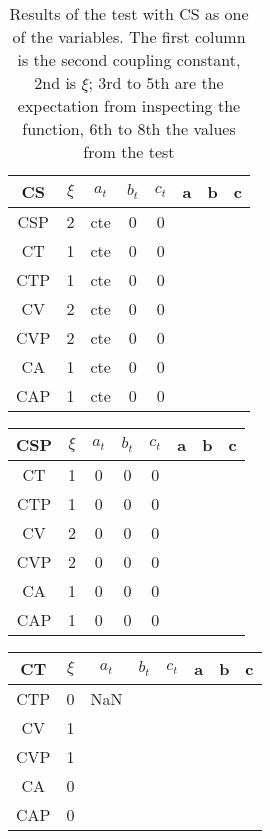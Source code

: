 \documentclass[twocolumn]{article}
\begin{document}
\begin{table}[H]
	\begin{tabular}{|c|c|c|c|c|c|c|c|}
		\hline
		CS & $\xi $& $a_t$ & $b_t$ & $c_t$ & a & b & c \\
		\hline
		CSP & 2 & cte & 0 & 0  &   &   &  \\
		\hline
		CT & 1 & cte & 0 & 0 &   &   &  \\
		\hline
		CTP & 1 & cte & 0 & 0 &   &   &  \\
		\hline
		CV & 2 & cte & 0 & 0 &   &   &  \\
		\hline
		CVP & 2 & cte & 0 & 0 &   &   &  \\
		\hline
		CA & 1 & cte & 0 & 0 &   &   &  \\
		\hline
		CAP & 1 & cte & 0 & 0 &   &   &  \\
		\hline
	\end{tabular}
	\caption{Results of the test with CS as one of the variables. The first column is the second coupling constant, 2nd is $\xi$; 3rd to 5th are the expectation from inspecting the function, 6th to 8th the values from the test}
\end{table}

\begin{table}[H]
	\begin{tabular}{|c|c|c|c|c|c|c|c|}
		\hline
		CSP & $\xi $& $a_t$ & $b_t$ & $c_t$ & a & b & c \\
		\hline
		CT & 1 & 0 & 0 & 0 &   &   &   \\
		\hline
		CTP & 1 & 0 & 0 & 0 &   &   &   \\
		\hline
		CV & 2 & 0 & 0 & 0 &   &   &   \\
		\hline
		CVP & 2 & 0 & 0 & 0 &   &   &   \\
		\hline
		CA & 1 & 0 & 0 & 0 &   &   &   \\
		\hline
		CAP & 1 & 0 & 0 & 0 &   &   &   \\
		\hline
	\end{tabular}
\end{table}

\begin{table}[H]
	\begin{tabular}{|c|c|c|c|c|c|c|c|}
		\hline
		CT & $\xi $& $a_t$ & $b_t$ & $c_t$ & a & b & c \\
		\hline
		CTP & 0 & NaN  &   &   &   &   &   \\
		\hline
		CV & 1 &   &   &   &   &   &   \\
		\hline
		CVP & 1 &   &   &   &   &   &   \\
		\hline
		CA & 0 &   &   &   &   &   &   \\
		\hline
		CAP & 0 &   &   &   &   &   &   \\
		\hline
	\end{tabular}
\end{table}
\end{document}
